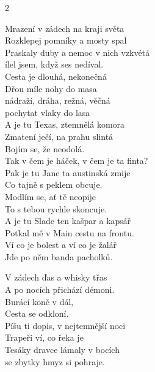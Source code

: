 \newpage
{}
\begin{multicols}{2}


\ve{}
Mrazení v zádech na kraji světa\\
Rozklepej pomníky a mosty spal\\
Praskaly duby a nemoc v nich vzkvétá\\
ílel jsem, když ses nedíval.\\

\ve
Cesta je dlouhá, nekonečná\\
Dřou míle nohy do masa\\
nádraží, dráha, režná, věčná\\
pochytat vlaky do lasa\\

\ve
A je tu Texas, ztemnělá komora\\
Zmatení ječí, na prahu slintá\\
Bojím se, že neodolá.\\
Tak v čem je háček, v čem je ta finta?\\

\ve
Pak je tu Jane ta austinská zmije\\
Co tajně s peklem obcuje.\\
Modlím se, ať tě neopije\\
To s tebou rychle skoncuje.\\

\ve
A je tu Slade ten kašpar a kapsář\\
Potkal mě v Main cestu na frontu.\\
Ví co je bolest a ví co je žalář\\
Jde po něm banda pacholků.\\

\vfill\columnbreak\vspace*{\fill}

\ve
V zádech ďas a whisky třas\\
A po nocích přichází démoni.\\
Burácí koně v dál,\\
Cesta se odkloní.\\


\ve
Píšu ti dopis, v nejtemnější noci\\
Trapeři ví, co řeka je\\
Tesáky dravce lámaly v bocích\\
se zbytky hmyz si pohraje.\\


\end{multicols}
